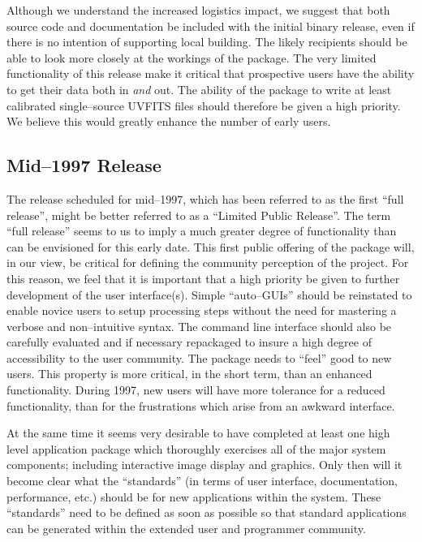 Although we understand the increased logistics impact, we suggest that
both source code and documentation be included with the initial binary
release, even if there is no intention of supporting local building.
The likely recipients should be able to look more closely at the
workings of the package. The very limited functionality of this
release make it critical that prospective users have the ability to
get their data both in {\it and} out. The ability of the package to
write at least calibrated single--source UVFITS files should therefore
be given a high priority. We believe this would greatly enhance the
number of early users.

\subsection{Mid--1997 Release}

The release scheduled for mid--1997, which has been referred to as the
first ``full release'', might be better referred to as a ``Limited
Public Release''. The term ``full release'' seems to us to imply a
much greater degree of functionality than can be envisioned for this
early date. This first public offering of the package will, in our
view, be critical for defining the community perception of the
project. For this reason, we feel that it is important that a high
priority be given to further development of the user
interface(s). Simple ``auto--GUIs'' should be reinstated to enable
novice users to setup processing steps without the need for mastering
a verbose and non--intuitive syntax.  The command line interface should
also be carefully evaluated and if necessary repackaged to insure a
high degree of accessibility to the user community. The package needs
to ``feel'' good to new users. This property is more critical, in the
short term, than an enhanced functionality. During 1997, new users
will have more tolerance for a reduced functionality, than for the
frustrations which arise from an awkward interface.

At the same time it seems very desirable to have completed at least
one high level application package which thoroughly exercises all of the
major system components; including interactive image display and
graphics. Only then will it become clear what the ``standards'' (in
terms of user interface, documentation, performance, etc.) should
be for new applications within the system. These ``standards'' need to
be defined as soon as possible so that standard applications can be
generated within the extended user and programmer community.

